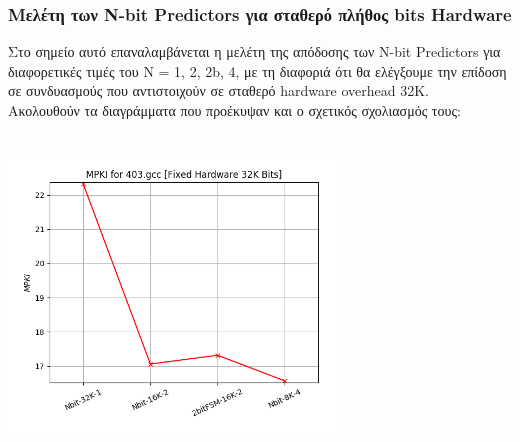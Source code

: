 \newpage
\vspace{3mm}

\subsubsection{Μελέτη των N-bit Predictors για σταθερό πλήθος bits Hardware}
Στο σημείο αυτό επαναλαμβάνεται η μελέτη της απόδοσης των N-bit Predictors για
διαφορετικές τιμές του N = 1, 2, 2b, 4, με τη διαφοριά ότι θα ελέγξουμε την
επίδοση σε συνδυασμούς που αντιστοιχούν σε σταθερό hardware overhead 32Κ. \\

\noindent Ακολουθούν τα διαγράμματα που προέκυψαν και ο σχετικός σχολιασμός
τους:
\vspace{1em}

   \begin{minipage}{\textwidth}
      \begin{center}
         \\
         \vspace{3mm}
         \includegraphics[width=0.65\textwidth, frame]{./graphs/4-2ii/403-gcc.png}
         \vspace{6mm}
      \end{center}
   \end{minipage}

